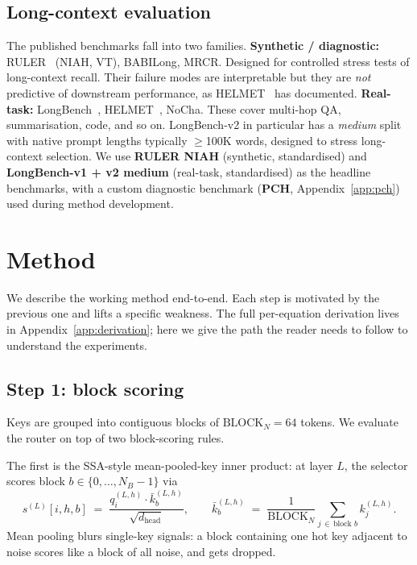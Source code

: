 \documentclass[11pt]{article}
\theoremstyle{remark}
\newcommand{\NB}{N_{\!B}}
\newcommand{\dhead}{d_{\text{head}}}
\newcommand{\BlockN}{\text{BLOCK}_N}
\begin{document}
\subsection{Long-context evaluation}

The published benchmarks fall into two families.
\textbf{Synthetic / diagnostic:} RULER~\citep{hsieh2024ruler} (NIAH, VT), BABILong, MRCR. Designed for controlled stress tests of long-context recall. Their failure modes are interpretable but they are \emph{not} predictive of downstream performance, as HELMET~\citep{yen2024helmet} has documented.
\textbf{Real-task:} LongBench~\citep{bai2023longbench, bai2024longbench}, HELMET~\citep{yen2024helmet}, NoCha. These cover multi-hop QA, summarisation, code, and so on. LongBench-v2 in particular has a \emph{medium} split with native prompt lengths typically $\geq$100K words, designed to stress long-context selection.
We use \textbf{RULER NIAH} (synthetic, standardised) and \textbf{LongBench-v1 + v2 medium} (real-task, standardised) as the headline benchmarks, with a custom diagnostic benchmark (\textbf{PCH}, Appendix~\ref{app:pch}) used during method development.

\section{Method}\label{sec:method}

We describe the working method end-to-end. Each step is motivated by the previous one and lifts a specific weakness. The full per-equation derivation lives in Appendix~\ref{app:derivation}; here we give the path the reader needs to follow to understand the experiments.

\subsection{Step 1: block scoring}

Keys are grouped into contiguous blocks of $\BlockN = 64$ tokens. We evaluate the router on top of two block-scoring rules.

The first is the SSA-style mean-pooled-key inner product: at layer $L$, the selector scores block $b \in \{0,\dots,\NB-1\}$ via
\begin{equation}\label{eq:block-score}
s^{(L)}[i,h,b] \;=\; \frac{q_i^{(L,h)}\cdot \bar k_b^{(L,h)}}{\sqrt{\dhead}},\qquad
\bar k_b^{(L,h)} \;=\; \frac{1}{\BlockN}\sum_{j \,\in\, \text{block }b} k_j^{(L,h)}.
\end{equation}
Mean pooling blurs single-key signals: a block containing one hot key adjacent to noise scores like a block of all noise, and gets dropped.
\end{document}
